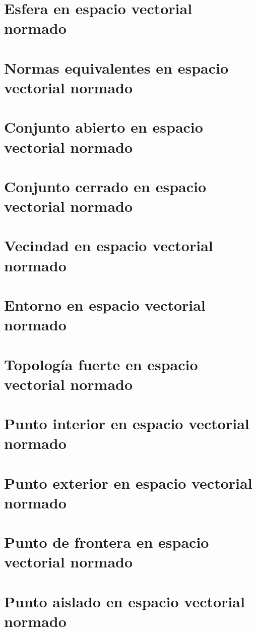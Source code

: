 \section{Esfera en espacio vectorial normado}

\section{Normas equivalentes en espacio vectorial normado}

\section{Conjunto abierto en espacio vectorial normado}

\section{Conjunto cerrado en espacio vectorial normado}

\section{Vecindad en espacio vectorial normado}

\section{Entorno en espacio vectorial normado}

\section{Topología fuerte en espacio vectorial normado}

\section{Punto interior en espacio vectorial normado}

\section{Punto exterior en espacio vectorial normado}

\section{Punto de frontera en espacio vectorial normado}

\section{Punto aislado en espacio vectorial normado}

